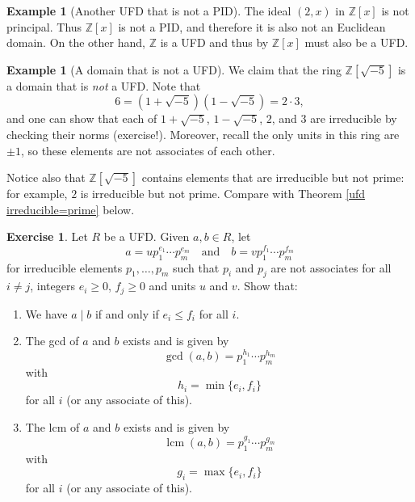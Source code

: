 \documentclass[12pt]{report}
\numberwithin{equation}{section}
\numberwithin{theorem}{chapter}
\theoremstyle{definition}
\newtheorem{example}[theorem]{Example}
\newtheorem{exercise}{Exercise}
\newtheorem*{basic properties}{Basic Properties}
\newtheorem*{Important Remark}{Important Remark}
\newcommand{\Z}{\mathbb{Z}}
\DeclareMathOperator{\lcm}{lcm}
\begin{document}
\begin{example}[Another UFD that is not a PID]
The ideal $(2,x)$ in $\Z[x]$ is not principal. Thus $\Z[x]$ is not a PID, and therefore it is also not an Euclidean domain. On the other hand, $\Z$ is a UFD and thus by  $\Z[x]$ must also be a UFD.
\end{example}


\begin{example}[A domain that is not a UFD]
We claim that the ring $\Z[\sqrt{-5}]$ is a domain that is {\em not} a UFD. Note that 
$$6=(1 + \sqrt{-5}) (1 - \sqrt{-5})=2\cdot 3,$$ 
and one can show that each of $1 + \sqrt{-5}$, $1 - \sqrt{-5}$, $2$, and $3$ are irreducible by checking their norms (exercise!). 
Moreover, recall the only units in this ring are $\pm 1$, so these elements are not associates of each other. 

Notice also that $\Z[\sqrt{-5}]$ contains elements that are irreducible but not prime: for example, $2$ is irreducible but not prime. Compare with Theorem
\ref{ufd irreducible=prime} below. 
\end{example}



\begin{exercise} 
Let $R$ be a UFD. Given $a, b \in R$, let
$$a = up_1^{e_1} \cdots p_m^{e_m} \quad \text{and} \quad b = vp_1^{f_1} \cdots p_m^{f_m}$$ 
for irreducible elements $p_1, \dots, p_m$ such that $p_i$ and $p_j$ are not associates for all $i \neq j$, integers $e_i \geqslant 0$, $f_j \geqslant 0$ and units $u$ and $v$. Show that:
\begin{enumerate}
\item We have $a \mid b$ if and only if $e_i \leqslant f_i$ for all $i$.
\item The gcd of $a$ and $b$ exists and is given by 
$$\gcd(a,b) = p_1^{h_1} \cdots p_m^{h_m}$$
with 
$$h_i = \min \{e_i, f_i\}$$ 
for all $i$ (or any associate of this).
\item The lcm of $a$ and $b$ exists and is given by
$$\lcm(a,b) = p_1^{g_1} \cdots p_m^{g_m}$$ 
with 
$$g_i = \max \{ e_i, f_i \}$$ 
for all $i$ (or any associate of this).    
\end{enumerate}
\end{exercise}

%    
%      
\end{document}

